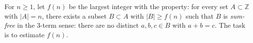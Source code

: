 For $n\ge 1$, let $f(n)$ be the largest integer with the property:
for every set $A\subset\mathbb Z$ with $|A|=n$, there exists a subset $B\subset A$ with $|B|\ge f(n)$ such that $B$ is \emph{sum-free} in the 3-term sense:
there are no distinct $a,b,c\in B$ with $a+b=c$.
The task is to estimate $f(n)$.
